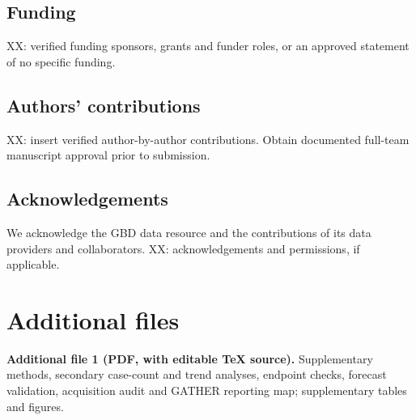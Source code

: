 \documentclass[11pt,a4paper]{article}
\begin{document}
\subsection*{Funding}
XX: verified funding sponsors, grants and funder roles, or an approved statement of no specific funding.
\subsection*{Authors' contributions}
XX: insert verified author-by-author contributions. Obtain documented full-team manuscript approval prior to submission.
\subsection*{Acknowledgements}
We acknowledge the GBD data resource and the contributions of its data providers and collaborators. XX: acknowledgements and permissions, if applicable.

\section*{Additional files}
\textbf{Additional file 1 (PDF, with editable TeX source).} Supplementary methods, secondary case-count and trend analyses, endpoint checks, forecast validation, acquisition audit and GATHER reporting map; supplementary tables and figures.
\end{document}
